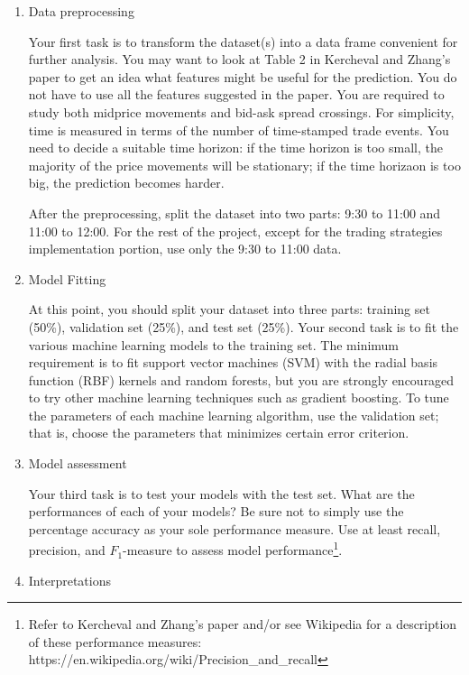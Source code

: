 \documentclass[11pt, oneside]{article}   	%
\begin{document}
\begin{enumerate}
\item Data preprocessing

Your first task is to transform the dataset(s) into a data frame convenient for 
further analysis. You may want to look at Table 2 in Kercheval and Zhang's paper 
to get an idea what features might be useful for the prediction. You do not have 
to use all the features suggested in the paper. You are required to study both 
midprice movements and bid-ask spread crossings. For simplicity, time is measured 
in terms of the number of time-stamped trade events. You need to decide a suitable 
time horizon: if the time horizon is too small, the majority of the price movements will be 
stationary; if the time horizaon is too big, the prediction becomes harder.

After the preprocessing, split the dataset into two parts: 9:30 to 11:00 and 11:00
to 12:00. For the rest of the project, except for the trading strategies implementation 
portion, use only the 9:30 to 11:00 data.


\item Model Fitting

At this point, you should split your dataset into three parts: training set (50\%), 
validation set (25\%), and test set (25\%). 
Your second task is to fit the various machine learning models to the training set. 
The minimum requirement is to fit support vector machines (SVM) with the radial 
basis function (RBF) kernels and random forests, but you are strongly encouraged 
to try other machine learning techniques such as gradient boosting. To tune the 
parameters of each machine learning algorithm, use the validation set; that is, 
choose the parameters that minimizes certain error criterion.

\item Model assessment

Your third task is to test your models with the test set. What are the performances 
of each of your models? Be sure not to simply use the percentage accuracy as your sole
performance measure. Use at least recall, precision, and $F_1$-measure to assess model 
performance\footnote{Refer to Kercheval and Zhang's paper and/or see Wikipedia for a 
description of these performance measures: https://en.wikipedia.org/wiki/Precision\_and\_recall}.

\item Interpretations


\end{enumerate}
\end{document}
